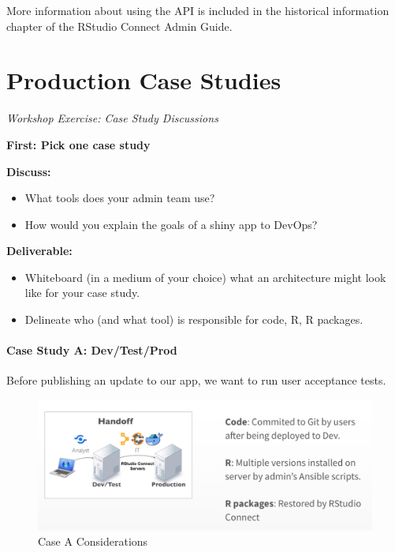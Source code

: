 \documentclass[]{book}
\providecommand{\tightlist}{%
  \setlength{\itemsep}{0pt}\setlength{\parskip}{0pt}}
\theoremstyle{definition}
\theoremstyle{definition}
\theoremstyle{definition}
\theoremstyle{remark}
\begin{document}
More information about using the API is included in the historical
information chapter of the RStudio Connect Admin Guide.

\hypertarget{production-case-studies}{%
\chapter{Production Case Studies}\label{production-case-studies}}

\emph{Workshop Exercise: Case Study Discussions}

\textbf{First: Pick one case study}

\textbf{Discuss:}

\begin{itemize}
\tightlist
\item
  What tools does your admin team use?
\item
  How would you explain the goals of a shiny app to DevOps?
\end{itemize}

\textbf{Deliverable:}

\begin{itemize}
\tightlist
\item
  Whiteboard (in a medium of your choice) what an architecture might
  look like for your case study.
\item
  Delineate who (and what tool) is responsible for code, R, R packages.
\end{itemize}

\hypertarget{case-study-a-devtestprod}{%
\subsubsection{Case Study A:
Dev/Test/Prod}\label{case-study-a-devtestprod}}

Before publishing an update to our app, we want to run user acceptance
tests.

\begin{figure}
\centering
\includegraphics{imgs/case-studies/case-a.png}
\caption{Case A Considerations}
\end{figure}
\end{document}
